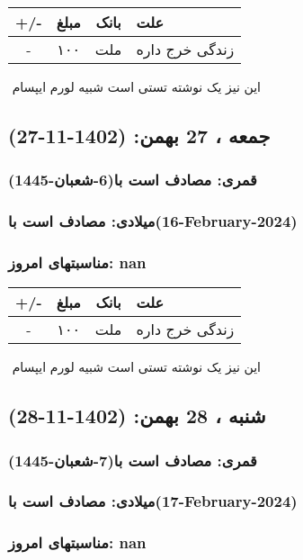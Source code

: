 \documentclass{article}
\newcommand{\rnote}[1]{\marginpar{\textcolor{color}{\StrSubstitute{\##1}{ }{\_}}}}
\newcommand{\myRow}[4]{
    #1 & #2 & #3 & #4 \\ \hline
}
\begin{document}
\begin{tabular}{ | c | c | c | p{5cm} |}
    \hline
    \myRow{ +/- }{مبلغ}{بانک}{علت}
    \myRow{-}{۱۰۰}{ملت}{زندگی خرج داره}
\end{tabular}
\newline
\newline

‌
\rnote{تست}
این نیز یک نوشته تستی است شبیه لورم ایپسام




\newpage
{}
\textcolor{color}{
\section{ جمعه ، 27 بهمن: (1402-11-27) }
\subsubsection*{قمری: مصادف است با(6-شعبان-1445)} 
\subsubsection*{میلادی: مصادف است با(16-February-2024)}
\subsubsection*{مناسبتهای امروز: nan}
}


\begin{tabular}{ | c | c | c | p{5cm} |}
    \hline
    \myRow{ +/- }{مبلغ}{بانک}{علت}
    \myRow{-}{۱۰۰}{ملت}{زندگی خرج داره}
\end{tabular}
\newline
\newline

‌
\rnote{تست}
این نیز یک نوشته تستی است شبیه لورم ایپسام




\newpage
{}
\textcolor{color}{
\section{ شنبه ، 28 بهمن: (1402-11-28) }
\subsubsection*{قمری: مصادف است با(7-شعبان-1445)} 
\subsubsection*{میلادی: مصادف است با(17-February-2024)}
\subsubsection*{مناسبتهای امروز: nan}
}
\end{document}

